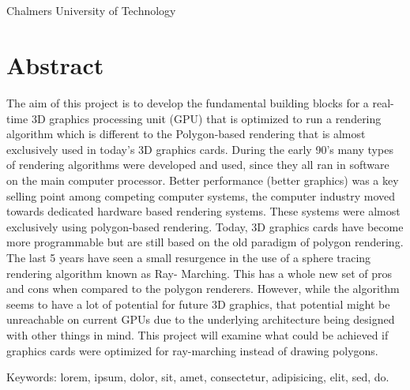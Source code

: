 \varHeadline\\
\varSubtitle\\
\varNames\\
\varDepartment\\
Chalmers University of Technology \setlength{\parskip}{0.5cm}

\thispagestyle{plain}			%
\setlength{\parskip}{0pt plus 1.0pt}
\section*{Abstract}
The aim of this project is to develop the fundamental building blocks for a real-time 3D 
graphics processing unit (GPU) that is optimized to run a rendering algorithm which is 
different to the Polygon-based rendering that is almost exclusively used in today's 3D 
graphics cards. During the early 90’s many types of rendering algorithms were developed and 
used, since they all ran in software on the main computer processor. Better performance 
(better graphics) was a key selling point among competing computer systems, the computer 
industry moved towards dedicated hardware based rendering systems. These systems were 
almost exclusively using polygon-based rendering. Today, 3D graphics cards have become more 
programmable but are still based on the old paradigm of polygon rendering. The last 5 years 
have seen a small resurgence in the use of a sphere tracing rendering algorithm known as Ray-
Marching. This has a whole new set of pros and cons when compared to the polygon renderers. 
However, while the algorithm seems to have a lot of potential for future 3D graphics, that 
potential might be unreachable on current GPUs due to the underlying architecture being 
designed with other things in mind. This project will examine what could be achieved if 
graphics cards were optimized for ray-marching instead of drawing polygons.

\vfill
Keywords: lorem, ipsum, dolor, sit, amet, consectetur, adipisicing, elit, sed, do.

\newpage				%
\thispagestyle{empty}
\mbox{}
